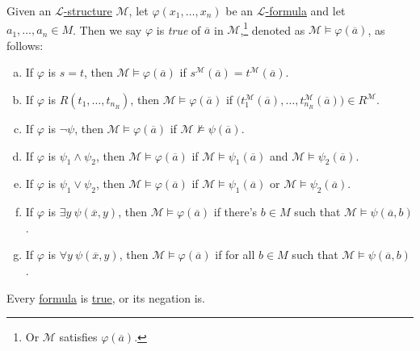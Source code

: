 \begin{definition}[Truth]\label{def:truth}
	Given an \hyperref[def:structure]{\(\mathcal{L} \)-structure} \(\mathcal{M} \), let \(\varphi (x_1, \ldots , x_n)\) be an \hyperref[def:formula]{\(\mathcal{L} \)-formula} and let \(a_1, \ldots , a_n\in M\). Then we say \(\varphi \) is \emph{true} of \(\overline{a} \) in \(\mathcal{M} \),\footnote{Or \(\mathcal{M} \) satisfies \(\varphi (\overline{a} )\).} denoted as \(\mathcal{M} \models \varphi (\overline{a} )\), as follows:
	\begin{enumerate}[(a)]
		\item If \(\varphi \) is \(s=t\), then \(\mathcal{M} \models \varphi (\overline{a} )\) if \(s^{\mathcal{M}} (\overline{a} ) = t^{\mathcal{M} } (\overline{a} )\).
		\item If \(\varphi \) is \(R(t_1, \ldots , t_{n_R})\), then \(\mathcal{M} \models \varphi (\overline{a} )\) if \(\big( t^{\mathcal{M} }_1(\overline{a} ), \ldots , t^{\mathcal{M} }_{n_R}(\overline{a} )  \big)\in R^{\mathcal{M} }\).
		\item If \(\varphi \) is \(\lnot \psi \), then \(\mathcal{M} \models \varphi (\overline{a} )\) if \(\mathcal{M} \not\models \psi (\overline{a} )\).
		\item If \(\varphi \) is \(\psi _1\land \psi _2\), then \(\mathcal{M} \models \varphi (\overline{a} )\) if \(\mathcal{M} \models \psi _1(\overline{a} )\) and \(\mathcal{M} \models \psi _2(\overline{a} )\).
		\item If \(\varphi \) is \(\psi _1\lor \psi _2\), then \(\mathcal{M} \models \varphi (\overline{a} )\) if \(\mathcal{M} \models \psi _1(\overline{a} )\) or \(\mathcal{M} \models \psi _2(\overline{a} )\).
		\item If \(\varphi \) is \(\exists y\ \psi (\overline{x} , y)\), then \(\mathcal{M} \models \varphi (\overline{a} )\) if there's \(b\in M\) such that \(\mathcal{M} \models \psi (\overline{a} , b)\).
		\item If \(\varphi \) is \(\forall y\ \psi (\overline{x} , y)\), then \(\mathcal{M} \models \varphi (\overline{a} )\) if for all \(b\in M\) such that \(\mathcal{M} \models \psi (\overline{a} , b)\).
	\end{enumerate}
\end{definition}

\begin{remark}
	Every \hyperref[def:formula]{formula} is \hyperref[def:truth]{true}, or its negation is.
\end{remark}
